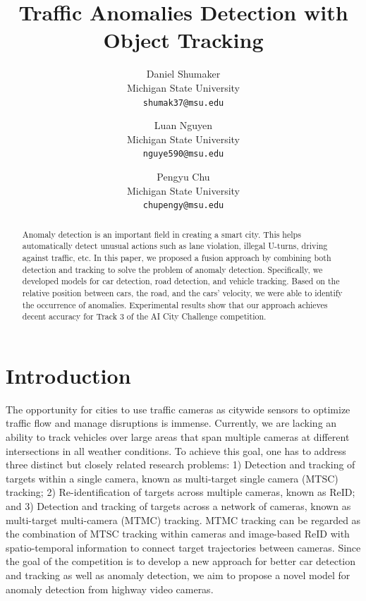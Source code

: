 \documentclass[10pt,twocolumn,letterpaper]{article}
\begin{document}
\title{Traffic Anomalies Detection with Object Tracking}
\author{
Daniel Shumaker\\
Michigan State University\\
{\tt\small shumak37@msu.edu}
\and
Luan Nguyen\\
Michigan State University\\
{\tt\small nguye590@msu.edu}
\and
Pengyu Chu\\
Michigan State University\\
{\tt\small chupengy@msu.edu}
}

\maketitle

\begin{abstract}
   Anomaly detection is an important field in creating a smart city. This helps automatically detect unusual actions such as lane violation, illegal U-turns, driving against traffic, etc. In this paper, we proposed a fusion approach by combining both detection and tracking to solve the problem of anomaly detection. Specifically, we developed models for car detection, road detection, and vehicle tracking. Based on the relative position between cars, the road, and the cars' velocity, we were able to identify the occurrence of anomalies. Experimental results show that our approach achieves decent accuracy for Track 3 of the AI City Challenge competition.
\end{abstract}

\section{Introduction}
The opportunity for cities to use traffic cameras as citywide sensors to optimize traffic flow and manage disruptions is immense. Currently, we are lacking an ability to track vehicles over large areas that span multiple cameras at different intersections in all weather conditions. To achieve this goal, one has to address three distinct but closely related research problems: 1) Detection and tracking of targets within a single camera, known as multi-target single camera (MTSC) tracking; 2) Re-identification of targets across multiple cameras, known as ReID; and 3) Detection and tracking of targets across a network of cameras, known as multi-target multi-camera (MTMC) tracking. MTMC tracking can be regarded as the combination of MTSC tracking within cameras and image-based ReID with spatio-temporal information to connect target trajectories between cameras. Since the goal of the competition is to develop a new approach for better car detection and tracking as well as anomaly detection, we aim to propose a novel model for anomaly detection from highway video cameras.
\end{document}
